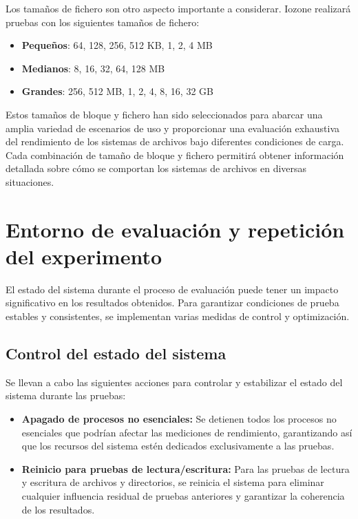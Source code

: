 \begin{tcolorbox}[title=Tamaños de fichero utilizados, colback=blue!5!white, colframe=gray!75!black]
Los tamaños de fichero son otro aspecto importante a considerar. Iozone realizará pruebas con los siguientes tamaños de fichero:
\begin{itemize}
    \item \textbf{Pequeños}: 64, 128, 256, 512 KB, 1, 2, 4 MB
    \item \textbf{Medianos}: 8, 16, 32, 64, 128 MB
    \item \textbf{Grandes}: 256, 512 MB, 1, 2, 4, 8, 16, 32 GB  
\end{itemize}
\end{tcolorbox}

Estos tamaños de bloque y fichero han sido seleccionados para abarcar una amplia variedad de escenarios de uso y proporcionar una evaluación exhaustiva del rendimiento de los sistemas de archivos bajo diferentes condiciones de carga. Cada combinación de tamaño de bloque y fichero permitirá obtener información detallada sobre cómo se comportan los sistemas de archivos en diversas situaciones.

\section{Entorno de evaluación y repetición del experimento}

El estado del sistema durante el proceso de evaluación puede tener un impacto significativo en los resultados obtenidos. Para garantizar condiciones de prueba estables y consistentes, se implementan varias medidas de control y optimización.

\subsection{Control del estado del sistema}

Se llevan a cabo las siguientes acciones para controlar y estabilizar el estado del sistema durante las pruebas:
\begin{itemize}
    \item \textbf{Apagado de procesos no esenciales:} Se detienen todos los procesos no esenciales que podrían afectar las mediciones de rendimiento, garantizando así que los recursos del sistema estén dedicados exclusivamente a las pruebas.
    \item \textbf{Reinicio para pruebas de lectura/escritura:} Para las pruebas de lectura y escritura de archivos y directorios, se reinicia el sistema para eliminar cualquier influencia residual de pruebas anteriores y garantizar la coherencia de los resultados.
\end{itemize}

